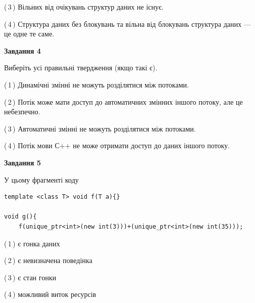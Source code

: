 \documentclass[12pt, ukrainian]{article}
\begin{document}
\begin {large}
{(\,3\,) Вільних від очікувань структур даних не існує.%

(\,4\,) Структура даних без блокувань та вільна від блокувань структура даних --- це одне те саме.%



\begin{center}
\textbf{Завдання 4}
\end{center}
Виберіть усі правильні твердження (якщо такі є).\par
\vspace{2mm}

(\,1\,) Динамічні змінні не можуть розділятися між потоками.%

(\,2\,) Потік може мати доступ до автоматичних змінних іншого потоку, але це небезпечно.%

(\,3\,) Автоматичні змінні не можуть розділятися між потоками.%

(\,4\,) Потік мови С++ не може отримати доступ до даних іншого потоку.%



\begin{center}
\textbf{Завдання 5}
\end{center}
У цьому фрагменті коду
\begin{verbatim}
template <class T> void f(T a){}

void g(){
    f(unique_ptr<int>(new int(3)))+(unique_ptr<int>(new int(35)));
\end{verbatim}

(\,1\,) є гонка даних%

(\,2\,) є невизначена поведінка%

(\,3\,) є стан гонки%

(\,4\,) можливий виток ресурсів%


}
\end {large}
\end{document}
